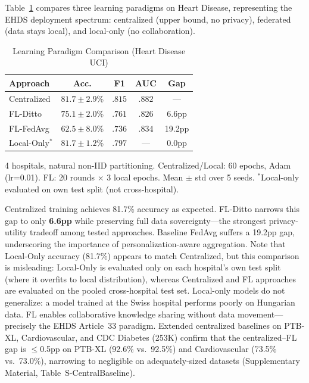 \documentclass[conference,a4paper]{IEEEtran}
\begin{document}
Table~\ref{tab:fl_vs_central} compares three learning paradigms on Heart Disease, representing the EHDS deployment spectrum: centralized (upper bound, no privacy), federated (data stays local), and local-only (no collaboration).

\begin{table}[htbp]
\centering
\caption{Learning Paradigm Comparison (Heart Disease UCI)}
\label{tab:fl_vs_central}
\small
\begin{tabular}{lcccc}
\toprule
\textbf{Approach} & \textbf{Acc.} & \textbf{F1} & \textbf{AUC} & \textbf{Gap} \\
\midrule
Centralized & $81.7 \pm 2.9$\% & $.815$ & $.882$ & --- \\
FL-Ditto & $75.1 \pm 2.0$\% & $.761$ & $.826$ & 6.6pp \\
FL-FedAvg & $62.5 \pm 8.0$\% & $.736$ & $.834$ & 19.2pp \\
Local-Only$^*$ & $81.7 \pm 1.2$\% & $.797$ & --- & 0.0pp \\
\bottomrule
\end{tabular}

\vspace{1mm}
\footnotesize{4 hospitals, natural non-IID partitioning. Centralized/Local: 60 epochs, Adam (lr=0.01). FL: 20 rounds $\times$ 3 local epochs. Mean $\pm$ std over 5 seeds. $^*$Local-only evaluated on own test split (not cross-hospital).}
\end{table}

Centralized training achieves 81.7\% accuracy as expected. FL-Ditto narrows this gap to only \textbf{6.6pp} while preserving full data sovereignty---the strongest privacy-utility tradeoff among tested approaches. Baseline FedAvg suffers a 19.2pp gap, underscoring the importance of personalization-aware aggregation. Note that Local-Only accuracy (81.7\%) appears to match Centralized, but this comparison is misleading: Local-Only is evaluated only on each hospital's own test split (where it overfits to local distribution), whereas Centralized and FL approaches are evaluated on the pooled cross-hospital test set. Local-only models do not generalize: a model trained at the Swiss hospital performs poorly on Hungarian data. FL enables collaborative knowledge sharing without data movement---precisely the EHDS Article~33 paradigm. Extended centralized baselines on PTB-XL, Cardiovascular, and CDC Diabetes (253K) confirm that the centralized--FL gap is $\leq$0.5pp on PTB-XL (92.6\% vs.\ 92.5\%) and Cardiovascular (73.5\% vs.\ 73.0\%), narrowing to negligible on adequately-sized datasets (Supplementary Material, Table~S-CentralBaseline).
\end{document}
